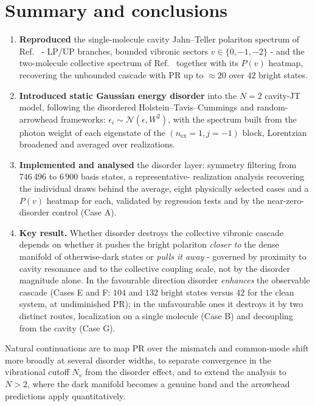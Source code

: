 \documentclass[12pt,a4paper]{article}
\newcommand{\PR}{\mathrm{PR}}
\begin{document}
\section{Summary and conclusions}\label{sec:summary}

\begin{enumerate}\itemsep2pt
  \item \textbf{Reproduced} the single-molecule cavity Jahn--Teller polariton
  spectrum of Ref.~\cite{Nandipati2023} - LP/UP branches, bounded vibronic
  sectors $v\in\{0,-1,-2\}$ - and the two-molecule collective spectrum of
  Ref.~\cite{Pandit2025} together with its $P(v)$ heatmap, recovering the
  unbounded cascade with $\PR$ up to $\approx20$ over $42$ bright states.
  \item \textbf{Introduced static Gaussian energy disorder} into the $N=2$
  cavity-JT model, following the disordered Holstein--Tavis--Cummings
  \cite{Wellnitz2022} and random-arrowhead \cite{Dubail2021} frameworks:
  $\epsilon_i\sim\mathcal N(\epsilon,W^2)$, with the spectrum built from the
  photon weight of each eigenstate of the $(n_{\mathrm{ex}}=1,j=-1)$ block,
  Lorentzian broadened and averaged over realizations.
  \item \textbf{Implemented and analysed} the disorder layer: symmetry
  filtering from $746\,496$ to $6\,900$ basis states, a representative-%
  realization analysis recovering the individual draws behind the average,
  eight physically selected cases and a $P(v)$
  heatmap for each, validated by regression tests and by the near-zero-disorder
  control (Case A).
  \item \textbf{Key result.} Whether disorder destroys the collective vibronic
  cascade depends on whether it pushes the bright polariton \emph{closer to}
  the dense manifold of otherwise-dark states or \emph{pulls it away} -
  governed by proximity to cavity resonance and to the collective coupling
  scale, not by the disorder magnitude alone. In the favourable direction
  disorder \emph{enhances} the observable cascade (Cases E and F: $104$ and
  $132$ bright states versus $42$ for the clean system, at undiminished
  $\PR$); in the unfavourable ones it destroys it by two distinct routes,
  localization on a single molecule (Case B) and decoupling from the cavity
  (Case G).
\end{enumerate}

Natural continuations are to map $\PR$ over the mismatch and common-mode shift
more broadly at
several disorder widths, to separate convergence in the vibrational cutoff
$N_v$ from the disorder effect, and to extend the analysis to $N>2$, where the
dark manifold becomes a genuine band and the arrowhead predictions apply
quantitatively.
\end{document}
